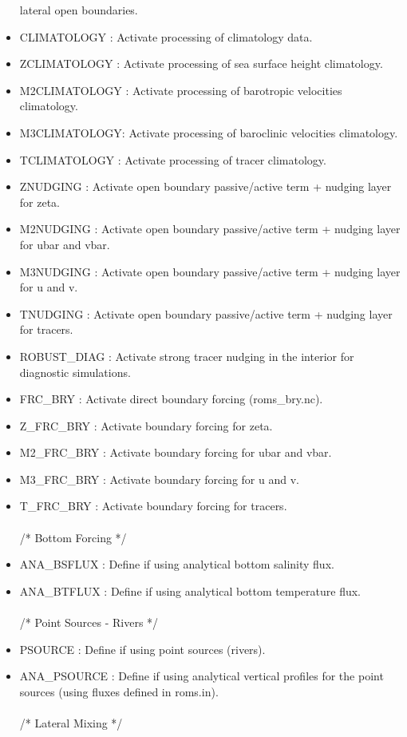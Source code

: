 \begin{itemize}
lateral open boundaries.
\item CLIMATOLOGY : Activate processing of climatology data.
\item ZCLIMATOLOGY : Activate processing of  sea surface height climatology.
\item M2CLIMATOLOGY : Activate processing of  barotropic velocities climatology.
\item M3CLIMATOLOGY: Activate processing of  baroclinic velocities climatology.
\item TCLIMATOLOGY : Activate processing of tracer climatology.
\item ZNUDGING : Activate open boundary passive/active term + nudging layer for zeta.
\item M2NUDGING : Activate open boundary passive/active term + nudging layer for ubar and vbar.
\item M3NUDGING : Activate open boundary passive/active term + nudging layer for u and v.
\item TNUDGING : Activate open boundary passive/active term + nudging layer for tracers.
\item ROBUST\_DIAG : Activate strong tracer nudging in the interior for diagnostic simulations.
\item FRC\_BRY : Activate direct boundary forcing (roms\_bry.nc).
\item Z\_FRC\_BRY : Activate boundary forcing for zeta.
\item M2\_FRC\_BRY : Activate boundary forcing for ubar and vbar.
\item M3\_FRC\_BRY : Activate boundary forcing for u and v.
\item T\_FRC\_BRY : Activate boundary forcing for tracers.
\\ \\ /*                       Bottom Forcing */
\item ANA\_BSFLUX : Define if using analytical bottom salinity flux.
\item ANA\_BTFLUX : Define if using analytical bottom temperature flux.
\\ \\ /*                       Point Sources - Rivers */
\item PSOURCE : Define if using point sources (rivers).
\item ANA\_PSOURCE : Define if using analytical vertical profiles for the point sources
(using fluxes defined in roms.in).
\\ \\ /*                       Lateral Mixing */

\end{itemize}
